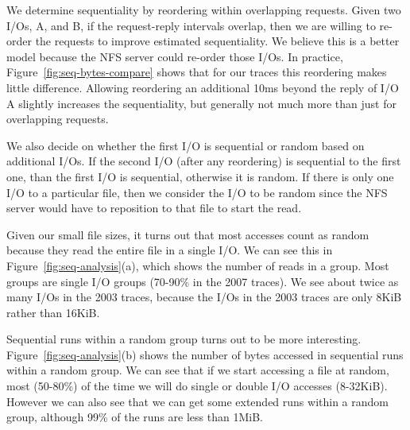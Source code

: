We determine sequentiality by reordering within overlapping
requests. Given two I/Os, A, and B, if the request-reply intervals
overlap, then we are willing to re-order the requests to improve
estimated sequentiality.  We believe this is a better model because
the NFS server could re-order those I/Os.  In practice,
Figure~\ref{fig:seq-bytes-compare} shows that for our traces this
reordering makes little difference.  Allowing reordering an additional
10ms beyond the reply of I/O A slightly increases the sequentiality,
but generally not much more than just for overlapping requests.

We also decide on whether the first I/O is sequential or random based
on additional I/Os.  If the second I/O (after any reordering) is
sequential to the first one, than the first I/O is sequential,
otherwise it is random.  If there is only one I/O to a particular
file, then we consider the I/O to be random since the NFS server would
have to reposition to that file to start the read.  

Given our small file sizes, it turns out that most accesses count as
random because they read the entire file in a single I/O.  We can see
this in Figure~\ref{fig:seq-analysis}(a), which shows the number of
reads in a group.  Most groups are single I/O groups (70-90\% in the
2007 traces).  We see about twice as many I/Os in the 2003 traces,
because the I/Os in the 2003 traces are only 8KiB rather than 16KiB.

Sequential runs within a random group turns out to be more
interesting.  Figure~\ref{fig:seq-analysis}(b) shows the number of
bytes accessed in sequential runs within a
random group.  We can see that if we start accessing a file at random,
most (50-80\%) of the time we will do single or double I/O accesses (8-32KiB).
However we can also see that we can get some extended runs within a
random group, although 99\% of the runs are less than 1MiB.



